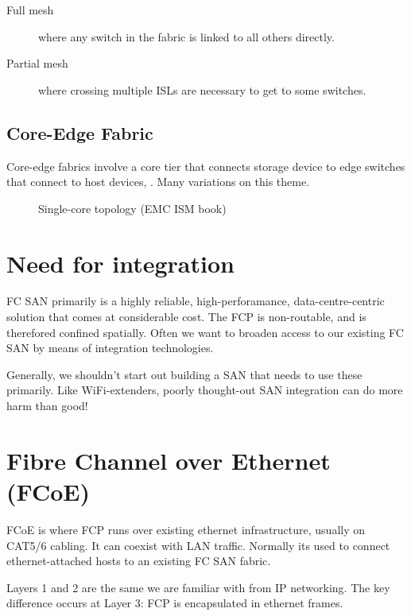 \begin{description}
\item[Full mesh]
where any switch in the fabric is linked to all others directly.
\item[Partial mesh]
where crossing multiple ISLs are necessary to get to some switches.
\end{description}

\subsection{Core-Edge Fabric}\label{core-edge-fabric}

Core-edge fabrics involve a core tier that connects storage device to
edge switches that connect to host devices, . Many variations on this
theme.

\begin{figure}
\centering
\caption{Single-core topology (EMC ISM book){}}
\end{figure}

\section{Need for integration}\label{need-for-integration}

FC SAN primarily is a highly reliable, high-perforamance,
data-centre-centric solution that comes at considerable cost. The FCP is
non-routable, and is therefored confined spatially. Often we want to
broaden access to our existing FC SAN by means of integration
technologies.

Generally, we shouldn't start out building a SAN that needs to use these
primarily. Like WiFi-extenders, poorly thought-out SAN integration can
do more harm than good!

\section{Fibre Channel over Ethernet
(FCoE)}\label{fibre-channel-over-ethernet-fcoe}

FCoE is where FCP runs over existing ethernet infrastructure, usually on
CAT5/6 cabling. It can coexist with LAN traffic. Normally its used to
connect ethernet-attached hosts to an existing FC SAN fabric.

Layers 1 and 2 are the same we are familiar with from IP networking. The
key difference occurs at Layer 3: FCP is encapsulated in ethernet
frames.

